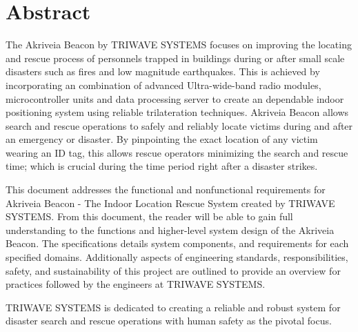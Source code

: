 %


\section*{Abstract}	
\medskip
The Akriveia Beacon by TRIWAVE SYSTEMS focuses on improving the locating and rescue process of personnels trapped in buildings during or after small scale disasters such as fires and low magnitude earthquakes. This is achieved by incorporating an combination of advanced Ultra-wide-band radio modules, microcontroller units and data processing server to create an dependable indoor positioning system using reliable trilateration techniques. Akriveia Beacon allows search and rescue operations to safely and reliably locate victims during and after an emergency or disaster. By pinpointing the exact location of any victim wearing an ID tag, this allows rescue operators minimizing the search and rescue time; which is crucial during the time period right after a disaster strikes.

\bigskip
This document addresses the functional and nonfunctional requirements for Akriveia Beacon - The Indoor Location Rescue System created by TRIWAVE SYSTEMS. From this document, the reader will be able to gain full understanding to the functions and higher-level system design of the Akriveia Beacon. The specifications details system components, and requirements for each specified domains. Additionally aspects of engineering standards, responsibilities, safety, and sustainability of this project are outlined to provide an overview for practices followed by the engineers at TRIWAVE SYSTEMS.

\bigskip
TRIWAVE SYSTEMS is dedicated to creating a reliable and robust system for disaster search and rescue operations with human safety as the pivotal focus. 

%